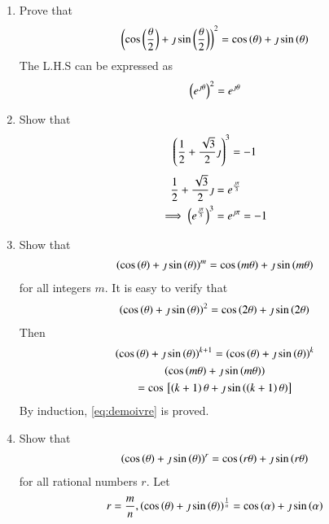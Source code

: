 \begin{enumerate}[label=\arabic*.,ref=\thesubsection.\theenumi]
\begin{enumerate}
\end{enumerate}
\item  Prove that
		\begin{align}
			\left(\cos\left(\frac{\theta}{2}\right)+\jmath\sin\left(\frac{\theta}{2}\right)\right)^2 = \cos\left(\theta\right)+\jmath\sin\left(\theta\right)
		\end{align}
		\solution The L.H.S can be expressed as 
		\begin{align}
			\left(e^{\jmath\theta}\right)^2 = e^{\jmath\theta}
		\end{align}
	\item Show that
		\begin{align}
			\left(\frac{1}{2}+\frac{\sqrt{3}}{2}\jmath\right)^3 = -1
		\end{align}
		\solution
		\begin{align}
\frac{1}{2}+\frac{\sqrt{3}}{2}\jmath &= e^{\frac{\jmath\pi}{3}}
			\\
			\implies \left(e^{\frac{\jmath\pi}{3}}\right)^3 &= e^{\jmath\pi} = -1
		\end{align}
	\item Show that 
		\begin{align}
			\left(\cos\left(\theta\right)+\jmath\sin\left(\theta\right)\right)^m = 
			\cos\left(m\theta\right)+\jmath\sin\left(m\theta\right)  
			\label{eq:demoivre}
		\end{align}
		for all integers $m$.
		\solution It is easy to verify that 
		\begin{align}
			\left( \cos\left(\theta\right)+\jmath\sin\left(\theta\right)\right)^2 = 
			 \cos\left(2\theta\right)+\jmath\sin\left(2\theta\right)  
		\end{align}
		Then 
		\begin{multline}
			\left(\cos\left(\theta\right)+\jmath\sin\left(\theta\right)\right)^{k+1} = 
			\left(\cos\left(\theta\right)+\jmath\sin\left(\theta\right)\right)^{k}
			\\
			\left( 
			\cos\left(m\theta\right)+\jmath\sin\left(m\theta\right)  \right)
			\\
			=
			\cos{}\left[\left(k+1\right)\theta+\jmath\sin\left(\left(k+1\right)\theta\right) \right]
		\end{multline}
		By induction, 
			\eqref{eq:demoivre}
			is proved.
	\item Show that 
		\begin{align}
			\left(\cos\left(\theta\right)+\jmath\sin\left(\theta\right)\right)^r = 
			\cos\left(r\theta\right)+\jmath\sin\left(r\theta\right)  
			\label{eq:demoivre-rational}
		\end{align}
		for all rational numbers $r$.
			\solution 	
			Let 
		\begin{align}
			r = \frac{m}{n},  \brak{\cos\brak{\theta}+\j\sin\brak{\theta}}^{\frac{1}{n}} = \cos\brak{\alpha}+\j\sin\brak{\alpha}

\end{align}
\end{enumerate}
